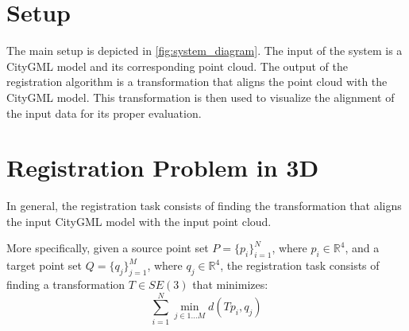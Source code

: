
    \section{Setup}
        The main setup is depicted in \autoref{fig:system_diagram}.
        The input of the system is a CityGML model and its corresponding point cloud. 
        The output of the registration algorithm is a transformation that aligns the point cloud with the CityGML model.
        This transformation is then used to visualize the alignment of the input data for its proper evaluation.

    \section{Registration Problem in 3D}
    \label{section:Registration Problem in 3D}
        In general, the registration task consists of finding the transformation that aligns the input CityGML model with the input point cloud.

        More specifically, given a source point set $P = \{p_i\}_{i=1}^N$, where $p_i \in \mathbb {R}^{4}$,
        and a target point set $Q = \{q_j\}_{j=1}^M$, where $q_j \in \mathbb {R}^{4}$,
        the registration task consists of finding a transformation $T \in SE(3)$ that minimizes:
        \begin{equation}
            \label{eq:lossfunction}
            \sum_{i = 1}^{N} \min_{j \in {1...M}} d( T p_i , q_j )    
        \end{equation}
          

